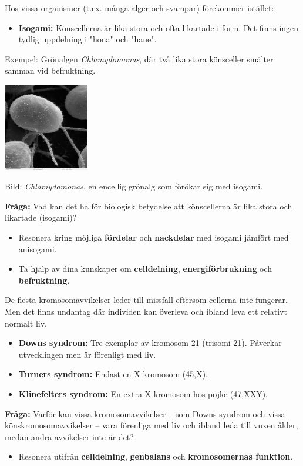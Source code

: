\documentclass{exam}
\begin{document}
\begin{questions}
Hos vissa organismer (t.ex. många alger och svampar) förekommer istället:
\begin{itemize}
  \item \textbf{Isogami:} Könscellerna är lika stora och ofta likartade i form. Det finns ingen tydlig uppdelning i "hona" och "hane".
\end{itemize}

Exempel: Grönalgen \textit{Chlamydomonas}, där två lika stora könsceller smälter samman vid befruktning.

\begin{center}
    \includegraphics[width=0.28\textwidth]{chlamydomonas.jpg}
    
    \small{Bild: \textit{Chlamydomonas}, en encellig grönalg som förökar sig med isogami.}
\end{center}

\textbf{Fråga:} Vad kan det ha för biologisk betydelse att könscellerna är lika stora och likartade (isogami)?
\begin{itemize}
  \item Resonera kring möjliga \textbf{fördelar} och \textbf{nackdelar} med isogami jämfört med anisogami.
  \item Ta hjälp av dina kunskaper om \textbf{celldelning}, \textbf{energiförbrukning} och \textbf{befruktning}.
\end{itemize}

\break

\question
De flesta kromosomavvikelser leder till missfall eftersom cellerna inte fungerar. Men det finns undantag där individen kan överleva och ibland leva ett relativt normalt liv.

\begin{itemize}
  \item \textbf{Downs syndrom:} Tre exemplar av kromosom 21 (trisomi 21). Påverkar utvecklingen men är förenligt med liv.
  \item \textbf{Turners syndrom:} Endast en X-kromosom (45,X).
  \item \textbf{Klinefelters syndrom:} En extra X-kromosom hos pojke (47,XXY).
\end{itemize}

\textbf{Fråga:} Varför kan vissa kromosomavvikelser – som Downs syndrom och vissa könskromosomavvikelser – vara förenliga med liv och ibland leda till vuxen ålder, medan andra avvikelser inte är det?

\begin{itemize}
  \item Resonera utifrån \textbf{celldelning}, \textbf{genbalans} och \textbf{kromosomernas funktion}.
\end{itemize}

\end{questions}
\end{document}
